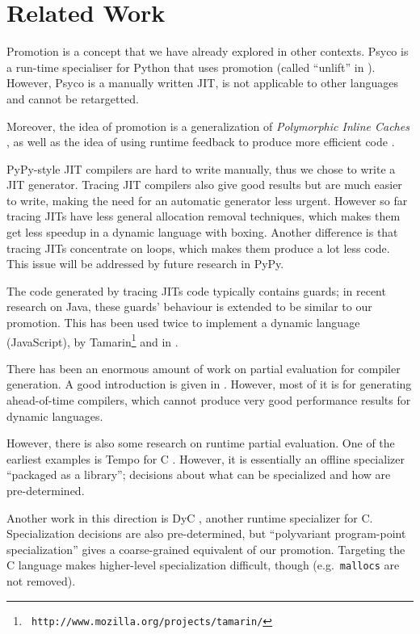 \section{Related Work}

Promotion is a concept that we have already explored in other contexts. Psyco is
a run-time specialiser for Python that uses promotion (called ``unlift'' in
\cite{DBLP:conf/pepm/Rigo04}). However, Psyco is a manually written JIT, is
not applicable to other languages and cannot be retargetted.

Moreover, the idea of promotion is a generalization of \emph{Polymorphic
  Inline Caches} \cite{hoelzle_optimizing_1991}, as well as the idea of using
runtime feedback to produce more efficient code
\cite{hoelzle_type_feedback_1994}.

PyPy-style JIT compilers are hard to write manually, thus we chose to write a
JIT generator.  Tracing JIT compilers \cite{gal_hotpathvm_2006} also give
good results but are much easier to write, making the need for an automatic
generator less urgent.  However so far tracing JITs have less general
allocation removal techniques, which makes them get less speedup in a dynamic
language with boxing.  Another difference is that tracing JITs concentrate on
loops, which makes them produce a lot less code.  This issue will be addressed
by future research in PyPy.

The code generated by tracing JITs code typically contains guards; in recent research
\cite{gal_incremental_2006} on Java, these guards' behaviour is extended to be
similar to our promotion.  This has been used twice to implement a dynamic
language (JavaScript), by Tamarin\footnote{{\tt
http://www.mozilla.org/projects/tamarin/}} and in \cite{chang_efficient_2007}.

There has been an enormous amount of work on partial evaluation for compiler
generation. A good introduction is given in \cite{Jones:peval}. However, most of
it is for generating ahead-of-time compilers, which cannot produce very good
performance results for dynamic languages.

However, there is also some research on runtime partial evaluation. One of the
earliest examples is Tempo for C
\cite{DBLP:conf/popl/ConselN96,DBLP:conf/dagstuhl/ConselHNNV96}. However, it is
essentially an offline specializer ``packaged as a library''; decisions about
what can be specialized and how are pre-determined.

Another work in this direction is DyC \cite{grant_dyc_2000}, another runtime
specializer for C.  Specialization decisions are also pre-determined, but
``polyvariant program-point specialization'' gives a coarse-grained equivalent
of our promotion.  Targeting the C language makes higher-level specialization
difficult, though (e.g.\ \texttt{mallocs} are not removed).

